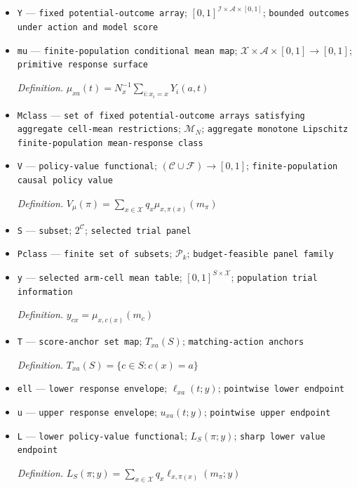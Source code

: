 \documentclass{article}
\begin{document}
\begin{itemize}
  \item \texttt{Y} --- \texttt{fixed potential-\allowbreak{}outcome array}; \([0,1]^{\mathcal I\times\mathcal A\times[0,1]}\); \texttt{bounded outcomes under action and model score}
  \item \texttt{mu} --- \texttt{finite-\allowbreak{}population conditional mean map}; \(\mathcal X\times\mathcal A\times[0,1]\to[0,1]\); \texttt{primitive response surface}
  \par\smallskip\noindent\emph{Definition.} \(\mu_{xa}(t)=N_x^{-1}\sum_{i:x_i=x}Y_i(a,t)\)
  \item \texttt{Mclass} --- \texttt{set of fixed potential-\allowbreak{}outcome arrays satisfying aggregate cell-\allowbreak{}mean restrictions}; \(\mathcal M_N\); \texttt{aggregate monotone Lipschitz finite-\allowbreak{}population mean-\allowbreak{}response class}
  \item \texttt{V} --- \texttt{policy-\allowbreak{}value functional}; \((\mathcal C\cup\mathcal F)\to[0,1]\); \texttt{finite-\allowbreak{}population causal policy value}
  \par\smallskip\noindent\emph{Definition.} \(V_{\mu}(\pi)=\sum_{x\in\mathcal X}q_x\mu_{x,\pi(x)}(m_{\pi})\)
  \item \texttt{S} --- \texttt{subset}; \(2^{\mathcal C}\); \texttt{selected trial panel}
  \item \texttt{Pclass} --- \texttt{finite set of subsets}; \(\mathcal P_k\); \texttt{budget-\allowbreak{}feasible panel family}
  \item \texttt{y} --- \texttt{selected arm-\allowbreak{}cell mean table}; \([0,1]^{S\times\mathcal X}\); \texttt{population trial information}
  \par\smallskip\noindent\emph{Definition.} \(y_{cx}=\mu_{x,c(x)}(m_c)\)
  \item \texttt{T} --- \texttt{score-\allowbreak{}anchor set map}; \(T_{xa}(S)\); \texttt{matching-\allowbreak{}action anchors}
  \par\smallskip\noindent\emph{Definition.} \(T_{xa}(S)=\{c\in S:c(x)=a\}\)
  \item \texttt{ell} --- \texttt{lower response envelope}; \(\ell_{xa}(t;y)\); \texttt{pointwise lower endpoint}
  \item \texttt{u} --- \texttt{upper response envelope}; \(u_{xa}(t;y)\); \texttt{pointwise upper endpoint}
  \item \texttt{L} --- \texttt{lower policy-\allowbreak{}value functional}; \(L_S(\pi;y)\); \texttt{sharp lower value endpoint}
  \par\smallskip\noindent\emph{Definition.} \(L_S(\pi;y)=\sum_{x\in\mathcal X}q_x\ell_{x,\pi(x)}(m_{\pi};y)\)

\end{itemize}
\end{document}
